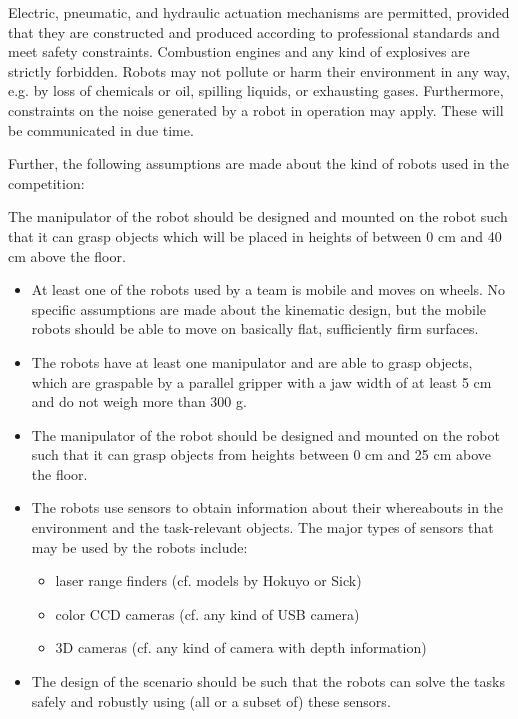 Electric, pneumatic, and hydraulic actuation mechanisms are permitted, provided that they are constructed and produced according to professional standards and meet safety constraints. Combustion engines and any kind of explosives are strictly forbidden. Robots may not pollute or harm their environment in any way, e.g. by loss of chemicals or oil, spilling liquids, or exhausting gases. Furthermore, constraints on the noise generated by a robot in operation may apply. These will be communicated in due time.
\par
Further, the following assumptions are made about the kind of robots used in the competition:



The manipulator of the robot should be designed and mounted on the robot such that it can grasp objects which will be placed in heights of between 0 cm and 40 cm above the floor.
\par
\begin{itemize}

	\item At least one of the robots used by a team is mobile and moves on wheels. No specific assumptions are made about the kinematic design, but the mobile robots should be able to move on basically flat, sufficiently firm surfaces.
	\item The robots have at least one manipulator and are able to grasp objects, which are graspable by a parallel gripper with a jaw width of at least 5 cm and do not weigh more than 300 g.
	\item The manipulator of the robot should be designed and mounted on the robot such that it can grasp objects from heights between 0 cm and 25 cm above the floor.
	\item The robots use sensors to obtain information about their whereabouts in the environment and the task-relevant objects. The major types of sensors that may be used by the robots include:
	\begin{itemize}
		\item laser range finders (cf. models by Hokuyo or Sick)
		\item color CCD cameras (cf. any kind of USB camera)
		\item 3D cameras (cf. any kind of camera with depth information)
	\end{itemize}
	\item The design of the scenario should be such that the robots can solve the tasks safely and robustly using (all or a subset of) these sensors.

\end{itemize}



